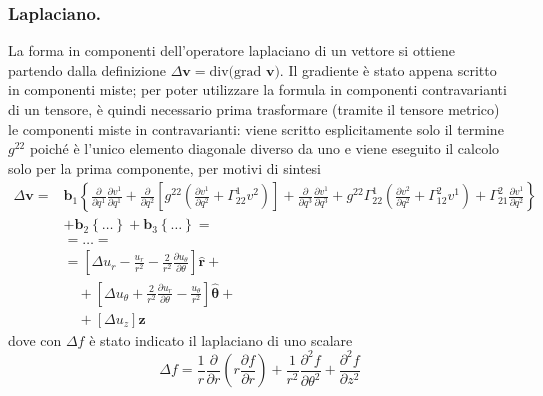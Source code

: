  \subsubsection{Laplaciano.} 
 La forma in componenti dell'operatore laplaciano di un vettore si ottiene partendo dalla definizione
 $\Delta \bm{v} = \text{div(grad $\bm{v}$)}$. Il gradiente è stato appena scritto in componenti miste; per poter utilizzare la
 formula in componenti contravarianti di un tensore, è quindi necessario prima trasformare (tramite il tensore metrico) le componenti
 miste in contravarianti: viene scritto esplicitamente solo il termine $g^{22}$ poiché è l'unico elemento diagonale diverso da uno e
 viene eseguito il calcolo solo per la prima componente, per motivi di sintesi
 \begin{equation}
 \begin{aligned}
  \Delta \bm{v} = &\bm{b}_1 \left\{ \frac{\partial}{\partial q^1}\frac{\partial v^1}{\partial q^1} +
               \frac{\partial}{\partial q^2} \left[ g^{22}\left( \frac{\partial v^1}{\partial q^2} + \Gamma_{22}^1 v^2 \right) \right] +
               \frac{\partial}{\partial q^3}\frac{\partial v^1}{\partial q^3} + 
               g^{22}\Gamma_{22}^1  \left( \frac{\partial v^2}{\partial q^2} + \Gamma_{12}^2 v^1 \right) +
               \Gamma_{21}^2 \frac{\partial v^1}{\partial q^2} \right\} \\
               & + \bm{b}_2 \left\{ \dots \right\} + \bm{b}_3 \left\{ \dots \right\} = \\
               & = \dots  = \\
               & = \left[ \Delta u_r - \frac{u_r}{r^2} - \frac{2}{r^2} \frac{\partial u_\theta}{\partial \theta}\right]\bm{\hat{r}} + \\
               & \quad + \left[ \Delta u_\theta + \frac{2}{r^2} \frac{\partial u_r}{\partial \theta} - \frac{u_\theta}{r^2} \right]\bm{\hat{\theta}}+ \\
               & \quad + \left[ \Delta u_z  \right]\bm{\hat{z}}
 \end{aligned}
 \end{equation}
 dove con $\Delta f$ è stato indicato il laplaciano di uno scalare
 \begin{equation}
   \Delta f = \frac{1}{r}\frac{\partial}{\partial r}\left( r \frac{\partial f}{\partial r}\right) +
               \frac{1}{r^2} \frac{\partial^2 f}{\partial \theta^2} + \frac{\partial^2 f}{\partial z^2}
 \end{equation}
 
